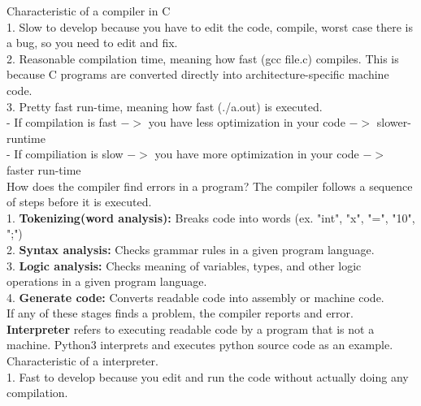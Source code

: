 \documentclass{article}
\begin{document}
\noindent Characteristic of a compiler in C \\

1. Slow to develop because you have to edit the code, compile, worst case there is a bug, so you need to edit and fix. \\

2. Reasonable compilation time, meaning how fast (gcc file.c) compiles. This is because C programs are converted directly into architecture-specific machine code. \\

3. Pretty fast run-time, meaning how fast (./a.out) is executed. \\

- If compilation is fast $->$ you have less optimization in your code $->$ slower-runtime \\

- If compiliation is slow $->$ you have more optimization in your code $->$ faster run-time \\

\noindent How does the compiler find errors in a program? The compiler follows a sequence of steps before it is executed. \\

1. \textbf{Tokenizing(word analysis):} Breaks code into words (ex. "int", "x", "=", "10", ";") \\

2. \textbf{Syntax analysis:} Checks grammar rules in a given program language. \\

3. \textbf{Logic analysis:} Checks meaning of variables, types, and other logic operations in a given program language. \\

4. \textbf{Generate code:} Converts readable code into assembly or machine code. \\

If any of these stages finds a problem, the compiler reports and error. \\

\noindent \textbf{Interpreter} refers to executing readable code by a program that is not a machine. Python3 interprets and executes python source code as an example. \\

\noindent Characteristic of a interpreter. \\

1. Fast to develop because you edit and run the code without actually doing any compilation. \\
\end{document}
